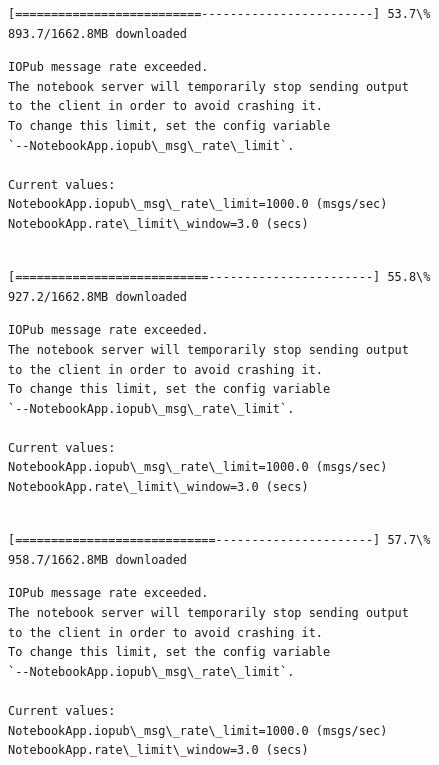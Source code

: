 \documentclass[11pt]{article}
\begin{document}
    \begin{Verbatim}[commandchars=\\\{\}]
[==========================------------------------] 53.7\% 893.7/1662.8MB downloaded
    \end{Verbatim}

    \begin{Verbatim}[commandchars=\\\{\}]
IOPub message rate exceeded.
The notebook server will temporarily stop sending output
to the client in order to avoid crashing it.
To change this limit, set the config variable
`--NotebookApp.iopub\_msg\_rate\_limit`.

Current values:
NotebookApp.iopub\_msg\_rate\_limit=1000.0 (msgs/sec)
NotebookApp.rate\_limit\_window=3.0 (secs)


    \end{Verbatim}

    \begin{Verbatim}[commandchars=\\\{\}]
[===========================-----------------------] 55.8\% 927.2/1662.8MB downloaded
    \end{Verbatim}

    \begin{Verbatim}[commandchars=\\\{\}]
IOPub message rate exceeded.
The notebook server will temporarily stop sending output
to the client in order to avoid crashing it.
To change this limit, set the config variable
`--NotebookApp.iopub\_msg\_rate\_limit`.

Current values:
NotebookApp.iopub\_msg\_rate\_limit=1000.0 (msgs/sec)
NotebookApp.rate\_limit\_window=3.0 (secs)


    \end{Verbatim}

    \begin{Verbatim}[commandchars=\\\{\}]
[============================----------------------] 57.7\% 958.7/1662.8MB downloaded
    \end{Verbatim}

    \begin{Verbatim}[commandchars=\\\{\}]
IOPub message rate exceeded.
The notebook server will temporarily stop sending output
to the client in order to avoid crashing it.
To change this limit, set the config variable
`--NotebookApp.iopub\_msg\_rate\_limit`.

Current values:
NotebookApp.iopub\_msg\_rate\_limit=1000.0 (msgs/sec)
NotebookApp.rate\_limit\_window=3.0 (secs)


    \end{Verbatim}
\end{document}

